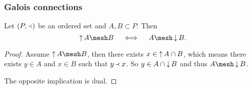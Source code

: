 \subsubsection{Galois connections}
\begin{lemma} \label{GaloisConnectionOrderClosure}
Let $\sSet{P, \Yleft}$ be an ordered set and $A,B \subset P$. Then
\[ \upset A \mesh B \quad\iff\quad A\mesh \downset B. \]
\end{lemma}
\begin{proof}
Assume $\upset A \mesh B$, then there exists $x\in \operatorname{\uparrow} A \cap B$, which means there exists $y\in A$ and $x\in B$ such that $y\Yleft x$. So $y\in A\cap \operatorname{\downarrow} B$ and thus $A\mesh \downset B$.

The opposite implication is dual.
\end{proof}

